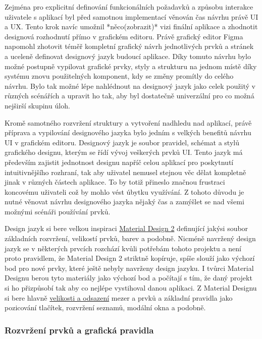 	Zejména pro explicitní definování funkcionálních požadavků a způsobu interakce uživatele s aplikací byl před samotnou
	implementací věnován čas návrhu právě \ac{UI} a \ac{UX}.
	Tento krok navíc umožnil *něco(zobrazit)* vizi finální aplikace a zhodnotit designová rozhodnutí přímo v grafickém
	editoru.
	Právě grafický editor Figma napomohl zhotovit téměř kompletní grafický návrh jednotlivých prvků a stránek a uceleně
	definovat designový jazyk budoucí aplikace.
	Díky tomuto návrhu bylo možné postupně vypilovat grafické prvky, styly a strukturu na jednom místě díky systému
	znovu použitelných komponent, kdy se změny promítly do celého návrhu.
	Bylo tak možné lépe nahlédnout na designový jazyk jako celek použitý v různých scénářích a upravit ho tak, aby byl
	dostatečně univerzální pro co možná nejširší skupinu úloh.

	Kromě samotného rozvržení struktury a vytvoření nadhledu nad aplikací, právě příprava a vypilování designového jazyka
	bylo jedním s velkých benefitů návrhu \ac{UI} v grafickém editoru.
	Designový jazyk je soubor pravidel, schémat a stylů grafického designu, kterým se řídí vývoj veškerých prvků \ac{UI}.
	Tento jazyk má především zajistit jednotnost designu napříč celou aplikací pro poskytnutí intuitivnějšího rozhraní,
	tak aby uživatel nemusel stejnou věc dělat kompletně jinak v různých částech aplikace.
	To by totiž přineslo značnou frustraci koncovému uživateli což by mohlo vést úbytku využívání.
	Z tohoto důvodu je nutné věnovat návrhu designového jazyka nějaký čas a zamýšlet se nad všemi možnými scénáři používání
	prvků.

	Design jazyk si bere velkou inspiraci \href{https://material.io/}{Material Design 2} definující jakýsi soubor
	základních rozvržení, velikostí prvků, barev a podobně.
	Nicméně navržený design jazyk se v některých prvcích rozchází kvůli potřebám tohoto projektu a není proto pravidlem,
	že Material Design 2 striktně kopíruje, spíše slouží jako výchozí bod pro nové prvky, které ještě nebyly navrženy
	design jazyku.
	I tvůrci Material Designu berou tyto materiály jako výchozí bod a počítají s tím, že daný projekt si ho přizpůsobí
	tak aby co nejlépe vystihoval danou aplikaci.
	Z Material Designu si bere hlavně \href{https://material.io/design/layout/spacing-methods.html#baseline-grid}{velikosti a odsazení}
	mezer a prvků a základní pravidla jako pozicování tlačítek, rozvržení seznamů, modální okna a podobně.

		\subsubsection{Rozvržení prvků a grafická pravidla}

